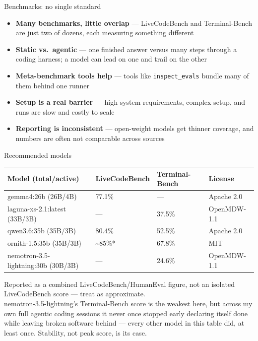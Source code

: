 \documentclass[aspectratio=169,10pt]{beamer}
\begin{document}
\begin{frame}{Benchmarks: no single standard}
  \begin{itemize}
    \small
    \item \textbf{Many benchmarks, little overlap} --- LiveCodeBench and
      Terminal-Bench are just two of dozens, each measuring something
      different
    \item \textbf{Static vs.\ agentic} --- one finished answer versus many
      steps through a coding harness; a model can lead on one and trail on
      the other
    \item \textbf{Meta-benchmark tools help} --- tools like
      \texttt{inspect\_evals} bundle many of them behind one runner
    \item \textbf{Setup is a real barrier} --- high system requirements,
      complex setup, and runs are slow and costly to scale
    \item \textbf{Reporting is inconsistent} --- open-weight models get
      thinner coverage, and numbers are often not comparable across sources
  \end{itemize}
\end{frame}

\begin{frame}{Recommended models}
  \footnotesize
  \renewcommand{\arraystretch}{1.2}
  \begin{center}
  \begin{tabular}{l l l l}
    \toprule
    \textbf{Model (total/active)} & \textbf{LiveCodeBench} & \textbf{Terminal-Bench} & \textbf{License} \\
    \midrule
    gemma4:26b (26B/4B) & 77.1\% & --- & Apache 2.0 \\
    laguna-xs-2.1:latest (33B/3B) & --- & 37.5\% & OpenMDW-1.1 \\
    qwen3.6:35b (35B/3B) & 80.4\% & 52.5\% & Apache 2.0 \\
    ornith-1.5:35b (35B/3B) & \textasciitilde{}85\%* & 67.8\% & MIT \\
    nemotron-3.5-lightning:30b (30B/3B) & --- & 24.6\% & OpenMDW-1.1 \\
    \bottomrule
  \end{tabular}
  \end{center}
  \vspace{0.4em}
  \footnotesize *Reported as a combined LiveCodeBench/HumanEval figure, not an
  isolated LiveCodeBench score --- treat as approximate.\\[0.3em]
  \color{muted} nemotron-3.5-lightning's Terminal-Bench score is the
  weakest here, but across my own full agentic coding sessions it never
  once stopped early declaring itself done while leaving broken software
  behind --- every other model in this table did, at least once.
  Stability, not peak score, is its case.
\end{frame}
\end{document}
